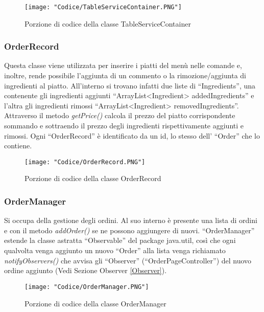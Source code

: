 \documentclass{article}
\begin{document}
\begin{figure}[!h]
\centering
\texttt{[image: "Codice/TableServiceContainer.PNG"]}
\caption{Porzione di codice della classe TableServiceContainer}
\end{figure}

\newpage

\subsubsection{OrderRecord}

Questa classe viene utilizzata per inserire i piatti del men\`u nelle comande e, inoltre, rende possibile l'aggiunta di un commento o la rimozione/aggiunta di ingredienti al piatto. All'interno si trovano infatti due liste di ``Ingredients'', una contenente gli ingredienti aggiunti ``ArrayList<Ingredient> addedIngredients'' e l'altra gli ingredienti rimossi ``ArrayList<Ingredient> removedIngredients''. Attraverso il metodo \textit{getPrice()} calcola il prezzo del piatto corrispondente sommando e sottraendo il prezzo degli ingredienti rispettivamente aggiunti e rimossi. Ogni ``OrderRecord'' \`e identificato da un id, lo stesso dell' ``Order'' che lo contiene.


\begin{figure}[!h]
\centering
\texttt{[image: "Codice/OrderRecord.PNG"]}
\caption{Porzione di codice della classe OrderRecord}
\end{figure}

\subsubsection{OrderManager}

Si occupa della gestione degli ordini. Al suo interno \`e presente una lista di ordini e con il metodo \textit{addOrder()} se ne possono aggiungere di nuovi. ``OrderManager'' estende la classe astratta ``Observable'' del package java.util, cos\`i che ogni qualvolta venga aggiunto un nuovo ``Order'' alla lista venga richiamato \textit{notifyObservers()} che avvisa gli ``Observer'' (``OrderPageController'') del nuovo ordine aggiunto (Vedi Sezione Observer \ref{Observer}). 

\newpage

\begin{figure}[!h]
\centering
\texttt{[image: "Codice/OrderManager.PNG"]}
\caption{Porzione di codice della classe OrderManager}
\end{figure}
\end{document}
